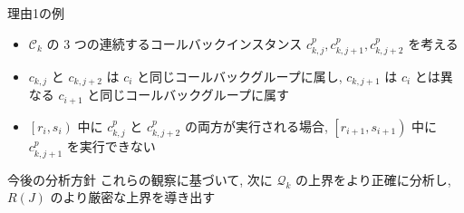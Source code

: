 {    \begin{frame}{理由1の例}
        \begin{itemize}
            \item $\mathcal{C}_{k}$ の 3 つの連続するコールバックインスタンス $c_{k, j}^{p}, c_{k, j+1}^{p}, c_{k, j+2}^{p}$ を考える
            \item $c_{k, j}$ と $c_{k, j+2}$ は $c_{i}$ と同じコールバックグループに属し, $c_{k, j+1}$ は $c_{i}$ とは異なる $c_{i+1}$ と同じコールバックグループに属す
            \item $\left[r_{i}, s_{i}\right)$ 中に $c_{k, j}^{p}$ と $c_{k, j+2}^{p}$ の両方が実行される場合, $\left[r_{i+1}, s_{i+1}\right)$ 中に $c_{k, j+1}^{p}$ を実行できない
        \end{itemize}
    \end{frame}

    \begin{frame}{今後の分析方針}
        これらの観察に基づいて, 次に $\mathcal{Q}_{k}$ の上界をより正確に分析し, $R(J)$ のより厳密な上界を導き出す
    \end{frame}
}
